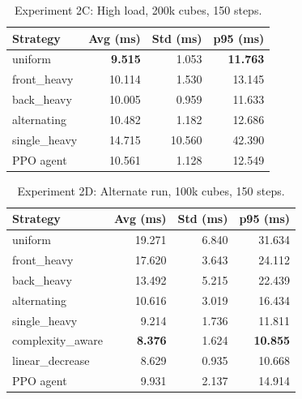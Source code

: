 \documentclass[9pt,openany]{extbook}
\begin{document}
\begin{table}[H]
  \centering
  \caption{Experiment 2C: High load, 200k cubes, 150 steps.}
  \label{tab:job_highload}
  \begin{tabular}{lrrr}
    \toprule
    Strategy      & Avg (ms) & Std (ms) & p95 (ms) \\
    \midrule
    uniform       & \textbf{9.515}  & 1.053  & \textbf{11.763} \\
    front\_heavy  & 10.114 & 1.530  & 13.145 \\
    back\_heavy   & 10.005 & 0.959  & 11.633 \\
    alternating   & 10.482 & 1.182  & 12.686 \\
    single\_heavy & 14.715 & 10.560 & 42.390 \\
    \midrule
    PPO agent     & 10.561 & 1.128  & 12.549 \\
    \bottomrule
  \end{tabular}
\end{table}

\begin{table}[H]
  \centering
  \caption{Experiment 2D: Alternate run, 100k cubes, 150 steps.}
  \label{tab:job_alternate}
  \begin{tabular}{lrrr}
    \toprule
    Strategy          & Avg (ms) & Std (ms) & p95 (ms) \\
    \midrule
    uniform           & 19.271 & 6.840 & 31.634 \\
    front\_heavy      & 17.620 & 3.643 & 24.112 \\
    back\_heavy       & 13.492 & 5.215 & 22.439 \\
    alternating       & 10.616 & 3.019 & 16.434 \\
    single\_heavy     & 9.214  & 1.736 & 11.811 \\
    complexity\_aware & \textbf{8.376}  & 1.624 & \textbf{10.855} \\
    linear\_decrease  & 8.629  & 0.935 & 10.668 \\
    \midrule
    PPO agent         & 9.931  & 2.137 & 14.914 \\
    \bottomrule
  \end{tabular}
\end{table}
\end{document}
